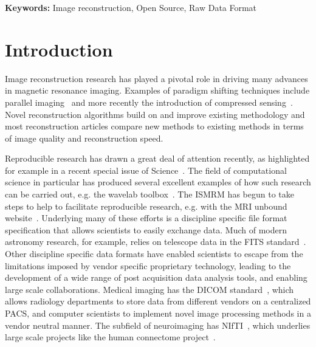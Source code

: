 \documentclass[12pt]{article}
\begin{document}
\textbf{Keywords:}  Image reconstruction, Open Source, Raw Data Format

\newpage
\clearpage
\onecolumn

\section*{Introduction}
Image reconstruction research has played a pivotal role in driving many advances in magnetic resonance imaging. Examples of paradigm shifting techniques include parallel imaging~\cite{Pruessmann:1999uq, Sodickson:1997fk, Griswold:2002kx}  and more recently the introduction of compressed sensing~\cite{Donoho:2006compressed, Lustig:2007vn}. Novel reconstruction algorithms build on and improve existing methodology and most reconstruction articles compare new methods to existing methods in terms of image quality and reconstruction speed.

Reproducible research has drawn a great deal of attention recently, as highlighted for example in a recent special issue of Science~\cite{Jasny:2011again, Peng:2011reproducible}. The field of computational science in particular has produced several excellent examples of how such research can be carried out, e.g. the wavelab toolbox~\cite{wavelab}.  The ISMRM has begun to take steps to help to facilitate reproducible research, e.g. with the MRI unbound website~\cite{mri_unbound}. Underlying many of these efforts is a discipline specific file format specification that allows scientists to easily exchange data.  Much of modern astronomy research, for example, relies on telescope data in the FITS standard~\cite{fits}.  Other discipline specific data formats have enabled scientists to escape from the limitations imposed by vendor specific proprietary technology, leading to the development of a wide range of post acquisition data analysis tools, and enabling large scale collaborations.  Medical imaging has the DICOM standard~\cite{dicom}, which allows radiology departments to store data from different vendors on a centralized PACS, and computer scientists to implement novel image processing methods in a vendor neutral manner. The subfield of neuroimaging has NIfTI~\cite{nifti}, which underlies large scale projects like the human connectome project~\cite{connectome}.
\end{document}
